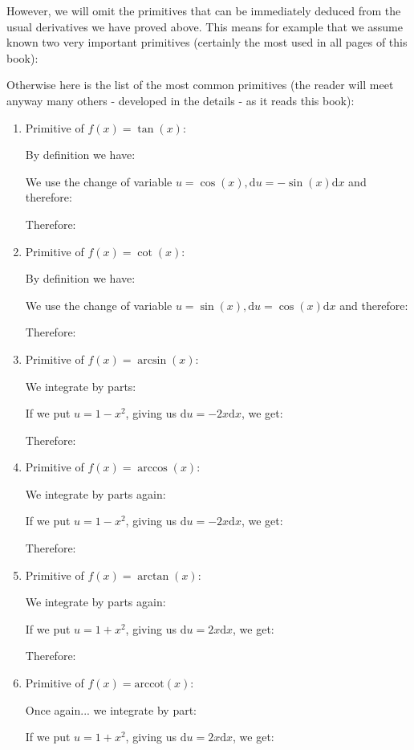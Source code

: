 	However, we will omit the primitives that can be immediately deduced from the usual derivatives we have proved above. This means for example that we assume  known two very important primitives (certainly the most used in all pages of this book):
		
	Otherwise here is the list of the most common primitives (the reader will meet anyway many others - developed in the details - as it reads this book):
	\begin{enumerate}
		\item Primitive of $f(x)=\tan (x)$:
		
		By definition we have:
		
		We use the change of variable $u=\cos(x),\mathrm{d}u=-\sin(x)\mathrm{d}x$ and therefore:
		
		Therefore:
		
		\item Primitive of $f(x)=\cot(x)$:
		
		By definition we have:
		
		We use the change of variable $u=\sin(x),\mathrm{d}u=\cos(x)\mathrm{d}x$ and therefore:
		 
		Therefore:
		
		\item Primitive of $f(x)=\arcsin(x)$:
		
		We integrate by parts:
		
		If we put $u=1-x^2$, giving us $\mathrm{d}u=-2x\mathrm{d}x$, we get:
		
		Therefore:
		
		\item Primitive of $f(x)=\arccos(x)$:
		
		We integrate by parts again:
		
		If we put $u=1-x^2$, giving us $\mathrm{d}u=-2x\mathrm{d}x$, we get:
		
		Therefore:
		
		\item Primitive of $f(x)=\arctan(x)$:
		
		We integrate by parts again:
		
		If we put $u=1+x^2$, giving us $\mathrm{d}u=2x\mathrm{d}x$, we get:
		
		Therefore:
		
		\item Primitive of $f(x)=\text{arccot}(x)$:
		
		Once again... we integrate by part:
		
		If we put $u=1+x^2$, giving us $\mathrm{d}u=2x\mathrm{d}x$, we get:
		

\end{enumerate}
